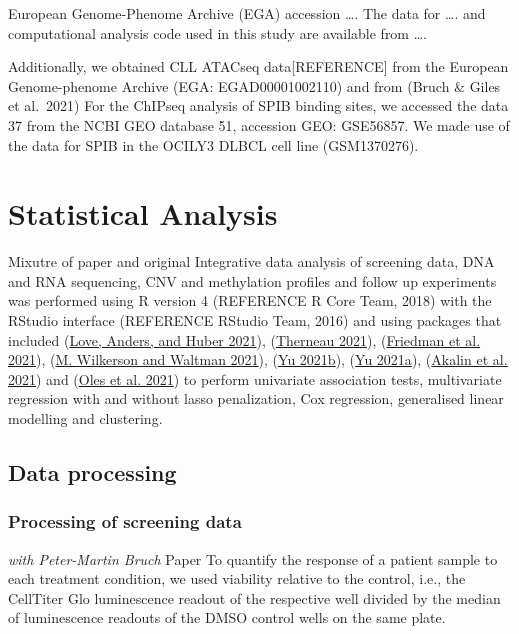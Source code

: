 \documentclass[11pt, a4paper, twosided]{book}
\begin{document}
European Genome-Phenome Archive (EGA) accession \ldots. The data for \ldots. and computational analysis code used in this study are available from \ldots.

Additionally, we obtained CLL ATACseq data{[}REFERENCE{]} from the European Genome-phenome Archive (EGA: EGAD00001002110) and from (Bruch \& Giles et al.~2021)
For the ChIPseq analysis of SPIB binding sites, we accessed the data 37 from the NCBI GEO database 51, accession GEO: GSE56857. We made use of the data for SPIB in the OCILY3 DLBCL cell line (GSM1370276).

\hypertarget{statistical-analysis}{%
\section{Statistical Analysis}\label{statistical-analysis}}

Mixutre of paper and original
Integrative data analysis of screening data, DNA and RNA sequencing, CNV and methylation profiles and follow up experiments was performed using R version 4 (REFERENCE R Core Team, 2018) with the RStudio interface (REFERENCE RStudio Team, 2016) and using packages that included (\protect\hyperlink{ref-R-DESeq2}{Love, Anders, and Huber 2021}), (\protect\hyperlink{ref-R-survival}{Therneau 2021}), (\protect\hyperlink{ref-R-glmnet}{Friedman et al. 2021}), (\protect\hyperlink{ref-R-ConsensusClusterPlus}{M. Wilkerson and Waltman 2021}), (\protect\hyperlink{ref-R-clusterProfiler}{Yu 2021b}), (\protect\hyperlink{ref-R-ChIPseeker}{Yu 2021a}), (\protect\hyperlink{ref-R-genomation}{Akalin et al. 2021}) and (\protect\hyperlink{ref-R-BloodCancerMultiOmics2017}{Oles et al. 2021}) to perform univariate association tests, multivariate regression with and without lasso penalization, Cox regression, generalised linear modelling and clustering.

\hypertarget{data-processing}{%
\subsection{Data processing}\label{data-processing}}

\hypertarget{processing-of-screening-data}{%
\subsubsection{Processing of screening data}\label{processing-of-screening-data}}

\emph{with Peter-Martin Bruch} Paper
To quantify the response of a patient sample to each treatment condition, we used viability relative to the control, i.e., the CellTiter Glo luminescence readout of the respective well divided by the median of luminescence readouts of the DMSO control wells on the same plate.
\end{document}
